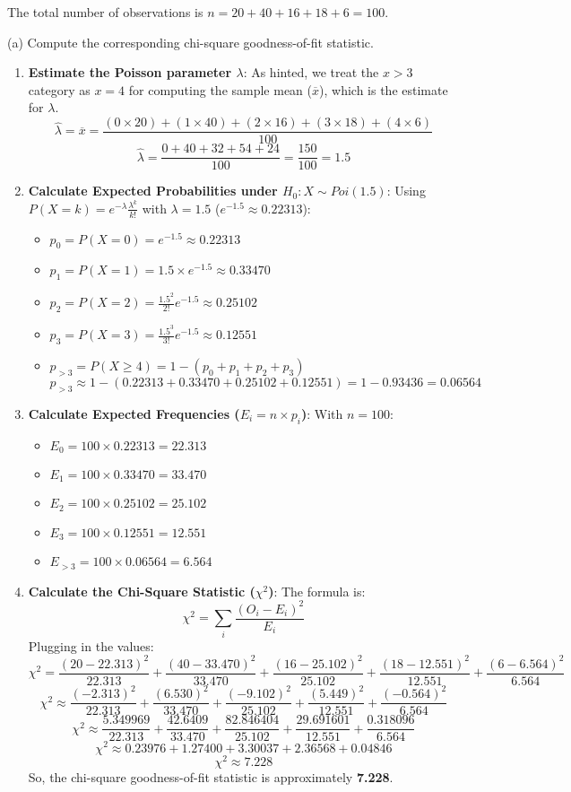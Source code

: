 The total number of observations is $n = 20 + 40 + 16 + 18 + 6 = 100$.

(a) Compute the corresponding chi-square goodness-of-fit statistic.

\begin{enumerate}
	\item \textbf{Estimate the Poisson parameter $\lambda$}: As hinted, we treat the $x>3$ category as $x=4$ for computing the sample mean ($\overline{x}$), which is the estimate for $\lambda$.
\[
\widehat{\lambda} = \overline{x} = \frac{(0 \times 20) + (1 \times 40) + (2 \times 16) + (3 \times 18) + (4 \times 6)}{100}
\]\[
\widehat{\lambda} = \frac{0 + 40 + 32 + 54 + 24}{100} = \frac{150}{100} = 1.5
\]	\item \textbf{Calculate Expected Probabilities under $H_0: X \sim Poi(1.5)$}:
Using $P(X=k) = e^{-\lambda} \frac{\lambda^k}{k!}$ with $\lambda = 1.5$ ($e^{-1.5} \approx 0.22313$):
	\begin{itemize}
		\item $p_0 = P(X=0) = e^{-1.5} \approx 0.22313$
		\item $p_1 = P(X=1) = 1.5 \times e^{-1.5} \approx 0.33470$
		\item $p_2 = P(X=2) = \frac{1.5^2}{2!} e^{-1.5} \approx 0.25102$
		\item $p_3 = P(X=3) = \frac{1.5^3}{3!} e^{-1.5} \approx 0.12551$
		\item $p_{>3} = P(X \ge 4) = 1 - (p_0 + p_1 + p_2 + p_3)$
$p_{>3} \approx 1 - (0.22313 + 0.33470 + 0.25102 + 0.12551) = 1 - 0.93436 = 0.06564$
	\end{itemize}
	\item \textbf{Calculate Expected Frequencies ($E_i = n \times p_i$)}:
With $n=100$:
	\begin{itemize}
		\item $E_0 = 100 \times 0.22313 = 22.313$
		\item $E_1 = 100 \times 0.33470 = 33.470$
		\item $E_2 = 100 \times 0.25102 = 25.102$
		\item $E_3 = 100 \times 0.12551 = 12.551$
		\item $E_{>3} = 100 \times 0.06564 = 6.564$
	\end{itemize}
	\item \textbf{Calculate the Chi-Square Statistic ($\chi^2$)}:
The formula is:
\[
\chi^2 = \sum_{i} \frac{(O_i - E_i)^2}{E_i}
\]Plugging in the values:
\[
\chi^2 = \frac{(20 - 22.313)^2}{22.313} + \frac{(40 - 33.470)^2}{33.470} + \frac{(16 - 25.102)^2}{25.102} + \frac{(18 - 12.551)^2}{12.551} + \frac{(6 - 6.564)^2}{6.564}
\]\[
\chi^2 \approx \frac{(-2.313)^2}{22.313} + \frac{(6.530)^2}{33.470} + \frac{(-9.102)^2}{25.102} + \frac{(5.449)^2}{12.551} + \frac{(-0.564)^2}{6.564}
\]\[
\chi^2 \approx \frac{5.349969}{22.313} + \frac{42.6409}{33.470} + \frac{82.846404}{25.102} + \frac{29.691601}{12.551} + \frac{0.318096}{6.564}
\]\[
\chi^2 \approx 0.23976 + 1.27400 + 3.30037 + 2.36568 + 0.04846
\]\[
\chi^2 \approx 7.228
\]So, the chi-square goodness-of-fit statistic is approximately \textbf{7.228}.
\end{enumerate}

